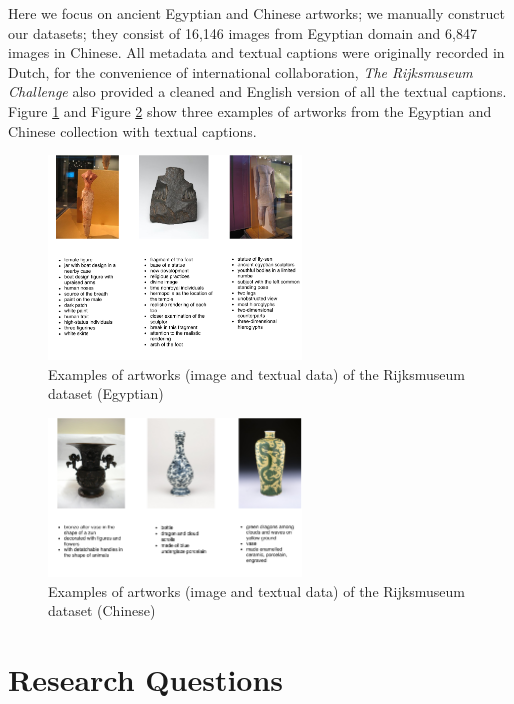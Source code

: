 Here we focus on ancient Egyptian and Chinese artworks; we manually construct our datasets; they consist of 16,146 images from Egyptian domain and 6,847 images in Chinese. All metadata and textual
captions were originally recorded in Dutch, for the convenience of international collaboration, \textit{The Rijksmuseum Challenge} \cite{MensinkICMIR2014} also provided a cleaned and English version of all the textual captions. Figure \ref{fig:sampleEgyptian} and Figure \ref{fig:sampleChinese} show three examples of artworks from the Egyptian and Chinese collection with textual captions.

\begin{figure}[h!]
\centering
\includegraphics[width=0.6\textwidth]{egyptian.pdf}
\caption{Examples of artworks (image and textual data) of the Rijksmuseum dataset (Egyptian) \cite{MensinkICMIR2014}}
\label{fig:sampleEgyptian}
\end{figure}

\begin{figure}[h!]
\centering
\includegraphics[width=0.6\textwidth]{chinese.pdf}
\caption{Examples of artworks (image and textual data) of the Rijksmuseum dataset (Chinese) \cite{MensinkICMIR2014}}
\label{fig:sampleChinese}
\end{figure}

\section{Research Questions}

